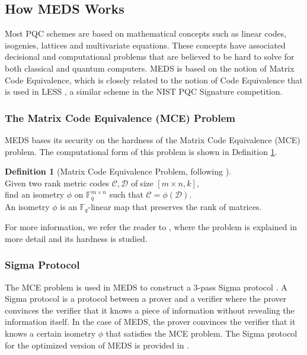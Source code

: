 \documentclass[11pt,a4paper]{report}
\theoremstyle{definition}
\newtheorem{definition}{Definition}[section]
\begin{document}
\subsection{How MEDS Works}
\label{sec:medsworks}
Most PQC schemes are based on mathematical concepts such as linear codes, isogenies, lattices and multivariate equations. These concepts have associated decisional and computational problems that are believed to be hard to solve for both classical and quantum computers. MEDS is based on the notion of Matrix Code Equivalence, which is closely related to the notion of Code Equivalence that is used in LESS \cite{biasse2020less}, a similar scheme in the NIST PQC Signature competition.

\subsubsection{The Matrix Code Equivalence (MCE) Problem}
MEDS bases its security on the hardness of the Matrix Code Equivalence (MCE) problem. The computational form of this problem is shown in Definition \ref{def:mceproblem}.

\begin{definition}[Matrix Code Equivalence Problem, following \cite{chou2023meds}]~\\
  \label{def:mceproblem}
  Given two rank metric codes $\mathcal{C}, \mathcal{D}$ of size $[m \times n, k]$,\\
  find an isometry $\phi$ on $\mathbb{F}_q^{m \times n}$ such that $\mathcal{C} = \phi(\mathcal{D})$.\\
  An isometry $\phi$ is an $\mathbb{F}_q$-linear map that preserves the rank of matrices. 
\end{definition}

For more information, we refer the reader to \cite{reijnders2024hardness}, where the problem is explained in more detail and its hardness is studied.

\subsubsection{Sigma Protocol}
\label{sec:sigmaprotocol}
The MCE problem is used in MEDS to construct a 3-pass Sigma protocol \cite{damgaard2002sigma}. A Sigma protocol is a protocol between a prover and a verifier where the prover convinces the verifier that it knows a piece of information without revealing the information itself. In the case of MEDS, the prover convinces the verifier that it knows a certain isometry $\phi$ that satisfies the MCE problem. The Sigma protocol for the optimized version of MEDS is provided in \cite[Section 4.2]{chou2024reducing}.
\end{document}
